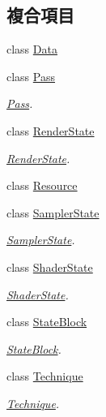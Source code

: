 \subsection*{複合項目}
\begin{DoxyCompactItemize}
\item 
class \hyperlink{class_i_dream_sky_1_1_material_1_1_data}{Data}
\item 
class \hyperlink{class_i_dream_sky_1_1_material_1_1_pass}{Pass}
\begin{DoxyCompactList}\small\item\em \hyperlink{class_i_dream_sky_1_1_material_1_1_pass}{Pass}. \end{DoxyCompactList}\item 
class \hyperlink{class_i_dream_sky_1_1_material_1_1_render_state}{Render\+State}
\begin{DoxyCompactList}\small\item\em \hyperlink{class_i_dream_sky_1_1_material_1_1_render_state}{Render\+State}. \end{DoxyCompactList}\item 
class \hyperlink{class_i_dream_sky_1_1_material_1_1_resource}{Resource}
\item 
class \hyperlink{class_i_dream_sky_1_1_material_1_1_sampler_state}{Sampler\+State}
\begin{DoxyCompactList}\small\item\em \hyperlink{class_i_dream_sky_1_1_material_1_1_sampler_state}{Sampler\+State}. \end{DoxyCompactList}\item 
class \hyperlink{class_i_dream_sky_1_1_material_1_1_shader_state}{Shader\+State}
\begin{DoxyCompactList}\small\item\em \hyperlink{class_i_dream_sky_1_1_material_1_1_shader_state}{Shader\+State}. \end{DoxyCompactList}\item 
class \hyperlink{class_i_dream_sky_1_1_material_1_1_state_block}{State\+Block}
\begin{DoxyCompactList}\small\item\em \hyperlink{class_i_dream_sky_1_1_material_1_1_state_block}{State\+Block}. \end{DoxyCompactList}\item 
class \hyperlink{class_i_dream_sky_1_1_material_1_1_technique}{Technique}
\begin{DoxyCompactList}\small\item\em \hyperlink{class_i_dream_sky_1_1_material_1_1_technique}{Technique}. \end{DoxyCompactList}\end{DoxyCompactItemize}
